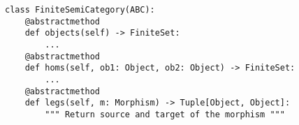 \begin{verbatim}
class FiniteSemiCategory(ABC):
    @abstractmethod
    def objects(self) -> FiniteSet:
        ...
    @abstractmethod
    def homs(self, ob1: Object, ob2: Object) -> FiniteSet:
        ...
    @abstractmethod
    def legs(self, m: Morphism) -> Tuple[Object, Object]:
        """ Return source and target of the morphism """
\end{verbatim}
